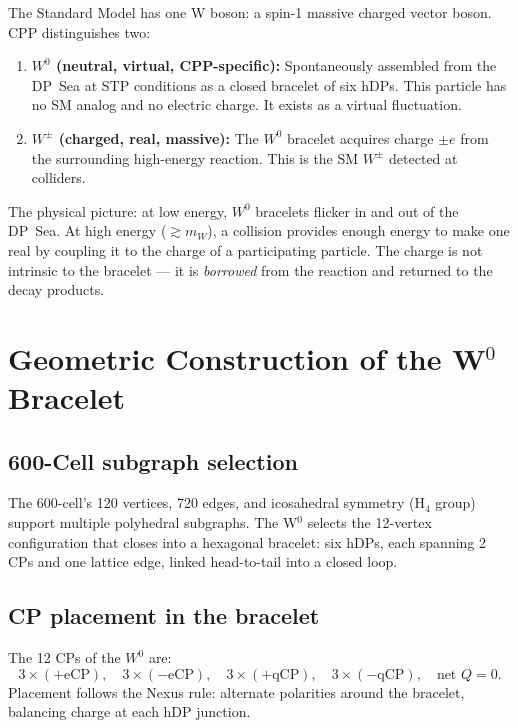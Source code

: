 \documentclass[11pt,letterpaper]{article}
\begin{document}
The Standard Model has one W boson: a spin-1 massive charged vector
boson.  CPP distinguishes two:

\begin{enumerate}
\item \textbf{$W^0$ (neutral, virtual, CPP-specific):} Spontaneously
  assembled from the DP~Sea at STP conditions as a closed bracelet
  of six hDPs.  This particle has no SM analog and no electric
  charge.  It exists as a virtual fluctuation.
\item \textbf{$W^\pm$ (charged, real, massive):} The $W^0$ bracelet
  acquires charge $\pm e$ from the surrounding high-energy reaction.
  This is the SM $W^\pm$ detected at colliders.
\end{enumerate}

The physical picture: at low energy, $W^0$ bracelets flicker in and
out of the DP~Sea.  At high energy ($\gtrsim m_W$), a collision
provides enough energy to make one real by coupling it to the charge
of a participating particle.  The charge is not intrinsic to the
bracelet --- it is \emph{borrowed} from the reaction and returned to
the decay products.

\section{Geometric Construction of the W$^0$ Bracelet}

\subsection{600-Cell subgraph selection}

The 600-cell's 120 vertices, 720 edges, and icosahedral symmetry
(H$_4$ group) support multiple polyhedral subgraphs.  The W$^0$
selects the 12-vertex configuration that closes into a hexagonal
bracelet: six hDPs, each spanning 2 CPs and one lattice edge,
linked head-to-tail into a closed loop.

\subsection{CP placement in the bracelet}

The 12 CPs of the $W^0$ are:
\[
3\times(+\text{eCP}),\quad
3\times(-\text{eCP}),\quad
3\times(+\text{qCP}),\quad
3\times(-\text{qCP}),
\quad\text{net } Q = 0.
\]
Placement follows the Nexus rule: alternate polarities around the
bracelet, balancing charge at each hDP junction.
\end{document}
